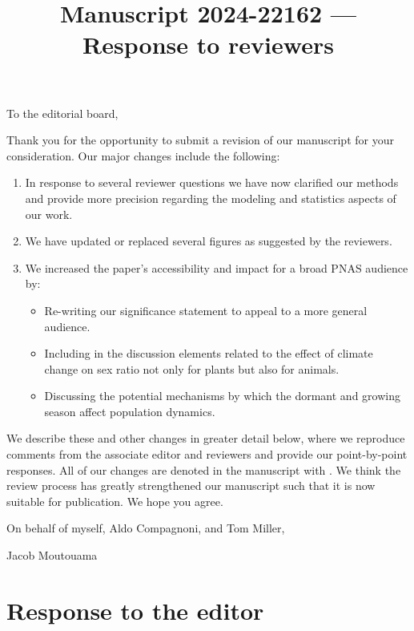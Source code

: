 \documentclass[12pt]{article}
\newcommand{\revise}[1]{{\color{Mahogany}{#1}}}
\begin{document}
\title{Manuscript 2024-22162 --- Response to reviewers}

\maketitle
\noindent To the editorial board,

Thank you for the opportunity to submit a revision of our manuscript for your consideration. Our major changes include the following:
\begin{enumerate}
	\item In response to several reviewer questions we have now clarified our methods and provide more precision regarding the modeling and statistics aspects of our work.
	\item We have updated or replaced several figures as suggested by the reviewers.
	\item We increased the paper’s accessibility and impact for a broad PNAS audience by: 
	\begin{itemize}
	\item Re-writing our significance statement to appeal to a more general audience.	
	\item Including in the discussion elements related to the effect of climate change on sex ratio not only for plants  but also for animals.
	\item Discussing the potential mechanisms by which the dormant and growing season affect population dynamics.
	\end{itemize}
\end{enumerate}

We describe these and other changes in greater detail below, where we reproduce comments from the associate editor and reviewers and provide our point-by-point responses. 
All of our changes are denoted in the manuscript with \revise{Mahogany font}.
We think the review process has greatly strengthened our manuscript such that it is now suitable for publication.
We hope you agree. 

\vspace{2em}
\hfill On behalf of myself, Aldo Compagnoni, and Tom Miller,

\hfill  Jacob Moutouama
\newpage

\section{Response to  the editor}
\vspace{-2em}
\end{document}
